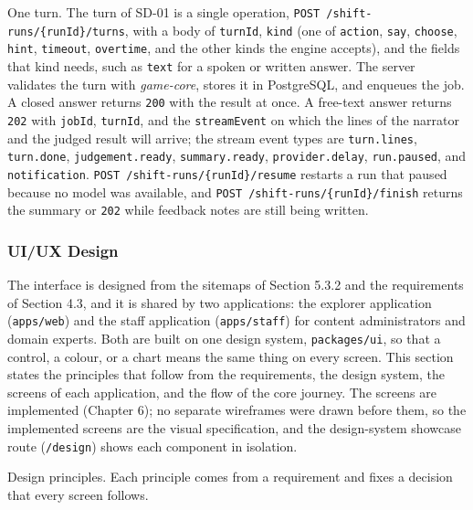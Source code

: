 One turn. The turn of SD-01 is a single operation, \texttt{POST /\allowbreak{}shift-\allowbreak{}runs/\allowbreak{}\{runId\}/\allowbreak{}turns}, with a body of \texttt{turnId}, \texttt{kind} (one of \texttt{action}, \texttt{say}, \texttt{choose}, \texttt{hint}, \texttt{timeout}, \texttt{overtime}, and the other kinds the engine accepts), and the fields that kind needs, such as \texttt{text} for a spoken or written answer. The server validates the turn with \textit{game-\allowbreak{}core}, stores it in PostgreSQL, and enqueues the job. A closed answer returns \texttt{200} with the result at once. A free-text answer returns \texttt{202} with \texttt{jobId}, \texttt{turnId}, and the \texttt{streamEvent} on which the lines of the narrator and the judged result will arrive; the stream event types are \texttt{turn.\allowbreak{}lines}, \texttt{turn.\allowbreak{}done}, \texttt{judgement.\allowbreak{}ready}, \texttt{summary.\allowbreak{}ready}, \texttt{provider.\allowbreak{}delay}, \texttt{run.\allowbreak{}paused}, and \texttt{notification}. \texttt{POST /\allowbreak{}shift-\allowbreak{}runs/\allowbreak{}\{runId\}/\allowbreak{}resume} restarts a run that paused because no model was available, and \texttt{POST /\allowbreak{}shift-\allowbreak{}runs/\allowbreak{}\{runId\}/\allowbreak{}finish} returns the summary or \texttt{202} while feedback notes are still being written.

\subsubsection{UI/UX Design}

The interface is designed from the sitemaps of Section 5.3.2 and the requirements of Section 4.3, and it is shared by two applications: the explorer application (\texttt{apps/\allowbreak{}web}) and the staff application (\texttt{apps/\allowbreak{}staff}) for content administrators and domain experts. Both are built on one design system, \texttt{packages/\allowbreak{}ui}, so that a control, a colour, or a chart means the same thing on every screen. This section states the principles that follow from the requirements, the design system, the screens of each application, and the flow of the core journey. The screens are implemented (Chapter 6); no separate wireframes were drawn before them, so the implemented screens are the visual specification, and the design-\allowbreak{}system showcase route (\texttt{/\allowbreak{}design}) shows each component in isolation.

Design principles. Each principle comes from a requirement and fixes a decision that every screen follows.

